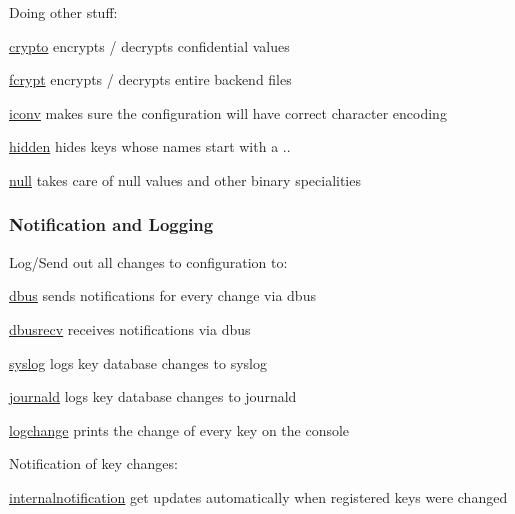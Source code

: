Doing other stuff\+:


\begin{DoxyItemize}
\item \hyperlink{md_src_plugins_crypto_README_src_plugins_crypto_README_md}{crypto} encrypts / decrypts confidential values
\item \hyperlink{md_src_plugins_fcrypt_README_src_plugins_fcrypt_README_md}{fcrypt} encrypts / decrypts entire backend files
\item \hyperlink{md_src_plugins_iconv_README_src_plugins_iconv_README_md}{iconv} makes sure the configuration will have correct character encoding
\item \hyperlink{md_src_plugins_hidden_README_src_plugins_hidden_README_md}{hidden} hides keys whose names start with a {\ttfamily .}.
\item \hyperlink{md_src_plugins_null_README_src_plugins_null_README_md}{null} takes care of null values and other binary specialities
\end{DoxyItemize}

\subsubsection*{Notification and Logging}

Log/\+Send out all changes to configuration to\+:


\begin{DoxyItemize}
\item \hyperlink{md_src_plugins_dbus_README_src_plugins_dbus_README_md}{dbus} sends notifications for every change via dbus
\item \hyperlink{md_src_plugins_dbusrecv_README_src_plugins_dbusrecv_README_md}{dbusrecv} receives notifications via dbus
\item \hyperlink{md_src_plugins_syslog_README_src_plugins_syslog_README_md}{syslog} logs key database changes to syslog
\item \hyperlink{md_src_plugins_journald_README_src_plugins_journald_README_md}{journald} logs key database changes to journald
\item \hyperlink{md_src_plugins_logchange_README_src_plugins_logchange_README_md}{logchange} prints the change of every key on the console
\end{DoxyItemize}

Notification of key changes\+:


\begin{DoxyItemize}
\item \hyperlink{md_src_plugins_internalnotification_README_src_plugins_internalnotification_README_md}{internalnotification} get updates automatically when registered keys were changed
\end{DoxyItemize}

